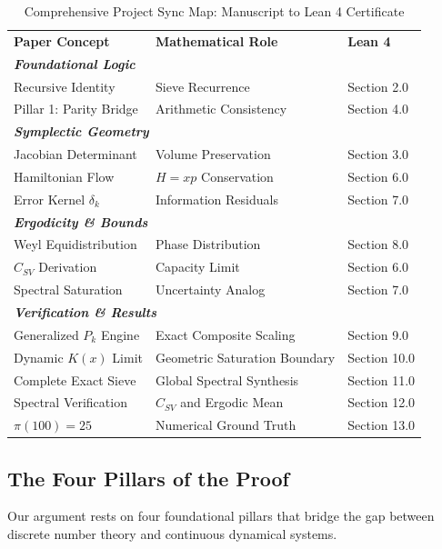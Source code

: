 \documentclass[sn-mathphys-num, pdflatex]{sn-jnl}
\begin{document}
\begin{table}[ht]
\small
\centering
\caption{Comprehensive Project Sync Map: Manuscript to Lean 4 Certificate}
\label{table:mapping}
\renewcommand{\arraystretch}{1.2}
\setlength{\tabcolsep}{0pt} 
\begin{tabular}{p{4.5cm} p{5.0cm} p{2.5cm}} 
\toprule
\textbf{Paper Concept} & \textbf{Mathematical Role} & \textbf{Lean 4} \\  
\cmidrule(r{1.5cm}){1-3} 
\multicolumn{3}{l}{\textit{\textbf{Foundational Logic}}} \\
Recursive Identity & Sieve Recurrence & Section 2.0 \\
Pillar 1: Parity Bridge & Arithmetic Consistency & Section 4.0 \\ 
\cmidrule(r{1.5cm}){1-3}
\multicolumn{3}{l}{\textit{\textbf{Symplectic Geometry}}} \\
Jacobian Determinant & Volume Preservation & Section 3.0 \\
Hamiltonian Flow & $H=xp$ Conservation & Section 6.0 \\
Error Kernel $\delta_k$ & Information Residuals & Section 7.0 \\ 
\cmidrule(r{1.5cm}){1-3}
\multicolumn{3}{l}{\textit{\textbf{Ergodicity \& Bounds}}} \\
Weyl Equidistribution & Phase Distribution & Section 8.0 \\
$C_{SV}$ Derivation & Capacity Limit & Section 6.0 \\
Spectral Saturation & Uncertainty Analog & Section 7.0 \\ 
\cmidrule(r{1.5cm}){1-3}
\multicolumn{3}{l}{\textit{\textbf{Verification \& Results}}} \\
Generalized $P_k$ Engine & Exact Composite Scaling & Section 9.0 \\
Dynamic $K(x)$ Limit & Geometric Saturation Boundary & Section 10.0 \\
Complete Exact Sieve & Global Spectral Synthesis & Section 11.0 \\
Spectral Verification & $C_{SV}$ and Ergodic Mean & Section 12.0 \\
$\pi(100) = 25$ & Numerical Ground Truth & Section 13.0 \\
\bottomrule
\end{tabular}
\end{table}

\subsection{The Four Pillars of the Proof}
Our argument rests on four foundational pillars that bridge the gap between discrete number theory and continuous dynamical systems.
\end{document}
